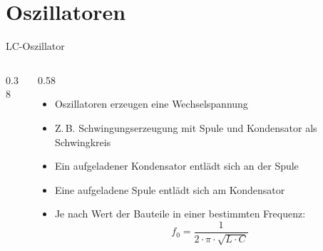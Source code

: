 
\section{Oszillatoren}
\label{section:oszillatoren}
%
\begin{frame}{LC-Oszillator}
    \begin{columns}
        \begin{column}{0.38\textwidth}
        \end{column}
        \begin{column}{0.58\textwidth}
            \begin{itemize}
                \item Oszillatoren erzeugen eine Wechselspannung
                \item Z.\,B. Schwingungserzeugung mit Spule und Kondensator als Schwingkreis
                \item Ein aufgeladener Kondensator entlädt sich an der Spule
                \item Eine aufgeladene Spule entlädt sich am Kondensator
                \item Je nach Wert der Bauteile in einer bestimmten Frequenz:
                $$ f_0 = \frac{1}{2\cdot\pi\cdot\sqrt{L\cdot C}}$$
            \end{itemize}
        \end{column}
    \end{columns}
\end{frame}

